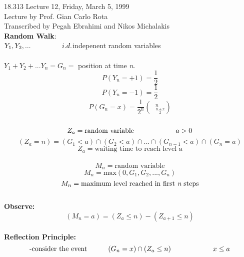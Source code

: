 {\Large 18.313 Lecture 12, Friday, March 5, 1999}\\
{\large Lecture by Prof. Gian Carlo Rota}\\
Transcribed by Pegah Ebrahimi and Nikos Michalakis\\

{\bf Random Walk}:
\\
$Y_1,Y_2,...\indent \indent \indent i.d.$indepenent random variables\\
\\$Y_1+Y_2+...Y_n = G_n =$ position at time {\it n}.\\
\begin{displaymath}P(Y_n= +1) = \frac{1}{2} \end{displaymath}
\begin{displaymath}P(Y_n= -1) = \frac{1}{2} \end{displaymath}
\begin{displaymath}P(G_n= x)  = \frac{1}{2^n}(\mbox{  }^n_{\frac{n+x}{2}})\end{displaymath}
\\
\begin{displaymath}Z_a = \mbox{random
variable\indent\indent\indent\indent} a>0\end{displaymath}
\begin{displaymath}(Z_a =n) = (G_1<a)\cap(G_2<a)\cap...\cap(G_{n-1}<a)\cap(G_n=a)\end{displaymath}
\begin{displaymath}Z_a = \mbox{waiting time to reach level a}
\end{displaymath}
\\
\begin{displaymath}M_n = \mbox{random variable}\end{displaymath}
\begin{displaymath}M_n = \mbox{max}(0,G_1,G_2,...,G_n)\end{displaymath}
\begin{displaymath}M_n = \mbox{maximum level reached in first {\it n} steps} \end{displaymath}
\\
{\bf\large Observe:}\\
\begin{displaymath}(M_n = a) = (Z_a \leq n) - (Z_{a+1}\leq n) \end{displaymath}
\\
{\bf\Large Reflection Principle:}\\
\begin{displaymath}\mbox{-consider the event\indent\indent }(G_n = x) \cap (Z_a \leq
n)\indent\indent\indent\indent x \leq a \end{displaymath}
